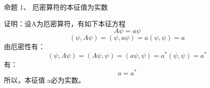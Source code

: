 \begin{frame} [allowframebreaks=]
    \frametitle{}
    \begin{atcbox}{命题 1、}
    厄密算符的本征值为实数
    \end{atcbox}
    \alert{证明：}设A为厄密算符，有如下本征方程
    $$A\psi=a\psi $$
    \begin{equation*}
        (\psi, A\psi)=(\psi, a\psi)=a(\psi, \psi)=a
    \end{equation*}  
    由厄密性有：
    \begin{equation*}
        (\psi, A\psi)=(A\psi, \psi)=(a\psi, \psi)= a^* (\psi, \psi)=a^*
    \end{equation*}
    有：
    \begin{equation*}
        a= a^* 
    \end{equation*}
    所以，本征值 a必为实数。
\end{frame} 

